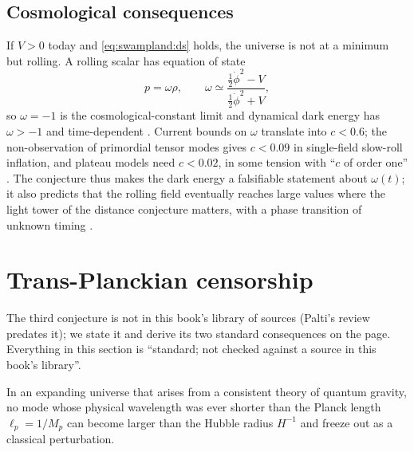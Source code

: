 \subsection{Cosmological consequences}

If $V>0$ today and \eqref{eq:swampland:ds} holds, the universe is not at a minimum but rolling.
A rolling scalar has equation of state
\begin{equation}\label{eq:swampland:eos}
p=\omega\rho,\qquad
\omega\simeq\frac{\tfrac12\dot\phi^2-V}{\tfrac12\dot\phi^2+V},
\end{equation}
so $\omega=-1$ is the cosmological-constant limit and dynamical dark energy has $\omega>-1$ and
time-dependent . Current bounds on $\omega$ translate into
$c<0.6$; the non-observation of primordial tensor modes gives $c<0.09$ in single-field slow-roll
inflation, and plateau models need $c<0.02$, in some tension with ``$c$ of order one''
. The conjecture thus makes the dark energy a falsifiable
statement about $\omega(t)$; it also predicts that the rolling field eventually reaches large
values where the light tower of the distance conjecture matters, with a phase transition of
unknown timing .

\section{Trans-Planckian censorship}\label{sec:swampland:tcc}

The third conjecture is not in this book's library of sources (Palti's review predates it); we
state it and derive its two standard consequences on the page. Everything in this section is
``standard; not checked against a source in this book's library''.

\begin{conjecture}\label{conj:swampland:tcc}
In an expanding universe that arises from a consistent theory of quantum gravity, no mode whose
physical wavelength was ever shorter than the Planck length $\ell_p=1/M_p$ can become larger than
the Hubble radius $H^{-1}$ and freeze out as a classical perturbation.
\end{conjecture}

